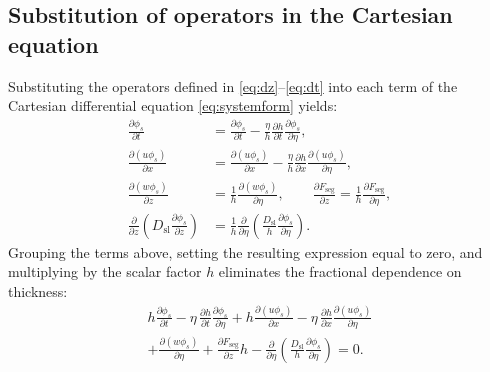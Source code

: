 \documentclass[lineno]{JFM-FLM_Au}
\begin{document}
\subsection{Substitution of operators in the Cartesian equation}
Substituting the operators defined in \eqref{eq:dz}--\eqref{eq:dt} into each term of the Cartesian differential equation \eqref{eq:systemform} yields:
\begin{align}
    \frac{\partial \phi_s}{\partial t} &= \frac{\partial \phi_s}{\partial t} - \frac{\eta}{h}\frac{\partial h}{\partial t}\frac{\partial \phi_s}{\partial \eta}, \\
    \frac{\partial (u\phi_s)}{\partial x} &= \frac{\partial (u\phi_s)}{\partial x} - \frac{\eta}{h}\frac{\partial h}{\partial x}\frac{\partial (u\phi_s)}{\partial \eta}, \\
    \frac{\partial (w\phi_s)}{\partial z} &= \frac{1}{h}\frac{\partial (w\phi_s)}{\partial \eta}, \qquad
    \frac{\partial F_{\mathrm{seg}}}{\partial z} = \frac{1}{h}\frac{\partial F_{\mathrm{seg}}}{\partial \eta}, \\
    \frac{\partial}{\partial z}\!\left(D_{\mathrm{sl}}\frac{\partial \phi_s}{\partial z}\right) &= \frac{1}{h}\frac{\partial}{\partial \eta}\!\left(\frac{D_{\mathrm{sl}}}{h}\frac{\partial \phi_s}{\partial \eta}\right).
\end{align}
Grouping the terms above, setting the resulting expression equal to zero, and multiplying by the scalar factor $h$ eliminates the fractional dependence on thickness:
\begin{multline}
    h\frac{\partial \phi_s}{\partial t} - \eta\,\frac{\partial h}{\partial t}\frac{\partial \phi_s}{\partial \eta}
    + h\frac{\partial (u\phi_s)}{\partial x} - \eta\,\frac{\partial h}{\partial x}\frac{\partial (u\phi_s)}{\partial \eta} \\
    + \frac{\partial (w\phi_s)}{\partial \eta} + \frac{\partial F_{\mathrm{seg}}}{\partial z}h - \frac{\partial}{\partial \eta}\!\left(\frac{D_{\mathrm{sl}}}{h}\frac{\partial \phi_s}{\partial \eta}\right) = 0.
    \label{eq:ast}
\end{multline}
\end{document}
